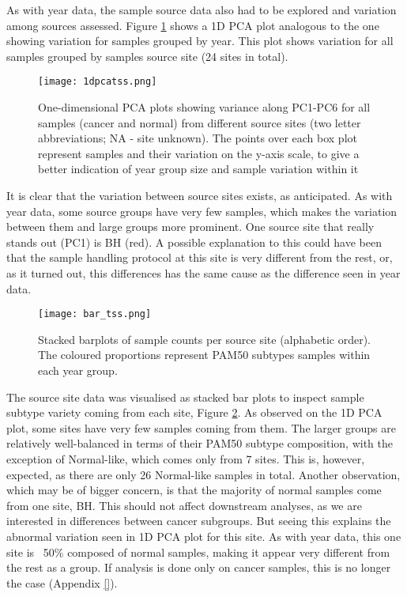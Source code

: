     \newpage
    As with year data, the sample source data also had to be explored and variation among sources assessed. Figure \ref{fig:1dpcatss} shows a 1D PCA plot analogous to the one showing variation for samples grouped by year. This plot shows variation for all samples grouped by samples source site (24 sites in total).\\  
            
            \begin{figure}[!h]
            \centering
            \texttt{[image: 1dpcatss.png]}
            \caption{One-dimensional PCA plots showing variance along PC1-PC6 for all samples (cancer and normal) from different source sites (two letter abbreviations; NA - site unknown). The points over each box plot represent samples and their variation on the y-axis scale, to give a better indication of year group size and sample variation within it}
            \label{fig:1dpcatss}
            \end{figure}

    It is clear that the variation between source sites exists, as anticipated. As with year data, some source groups have very few samples, which makes the variation between them and large groups more prominent. One source site that really stands out (PC1) is BH (red). A possible explanation to this could have been that the sample handling protocol at this site is very different  from the rest, or, as it turned out, this differences has the same cause as the difference seen in year data.\\
    
            \begin{figure}[!h]
            \centering
            \texttt{[image: bar\_tss.png]}
            \caption{Stacked barplots of sample counts per source site (alphabetic order). The coloured proportions represent PAM50 subtypes samples within each year group. }
            \label{fig:bartss}
            \end{figure}
    
    The source site data was visualised as stacked bar plots to inspect sample subtype variety coming from each site, Figure \ref{fig:bartss}. As observed on the 1D PCA plot, some sites have very few samples coming from them. The larger groups are relatively well-balanced in terms of their PAM50 subtype composition, with the exception of Normal-like, which comes only from 7 sites. This is, however, expected, as there are only 26 Normal-like samples in total. Another observation, which may be of bigger concern, is that the majority of normal samples come from one site, BH. This should not affect downstream analyses, as we are interested in differences between cancer subgroups. But seeing this explains the abnormal variation seen in 1D PCA plot for this site. As with year data, this one site is ~50\% composed of normal samples, making it appear very different from the rest as a group. If analysis is done only on cancer samples, this is no longer the case (Appendix \ref{}). 
    

